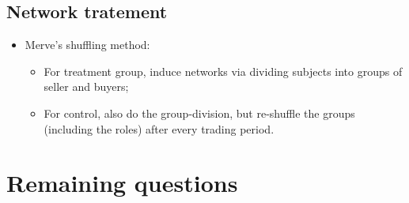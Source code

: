 \documentclass{article}
\begin{document}
\subsection{Network tratement}

\begin{itemize}
    \item Merve's shuffling method:
        \begin{itemize}
            \item For treatment group, induce networks via dividing subjects into groups 
            of seller and buyers;
            \item For control, also do the group-division, but re-shuffle the groups
            (including the roles) after every trading period.
        \end{itemize}
\end{itemize}


\section{Remaining questions}





\end{document}
